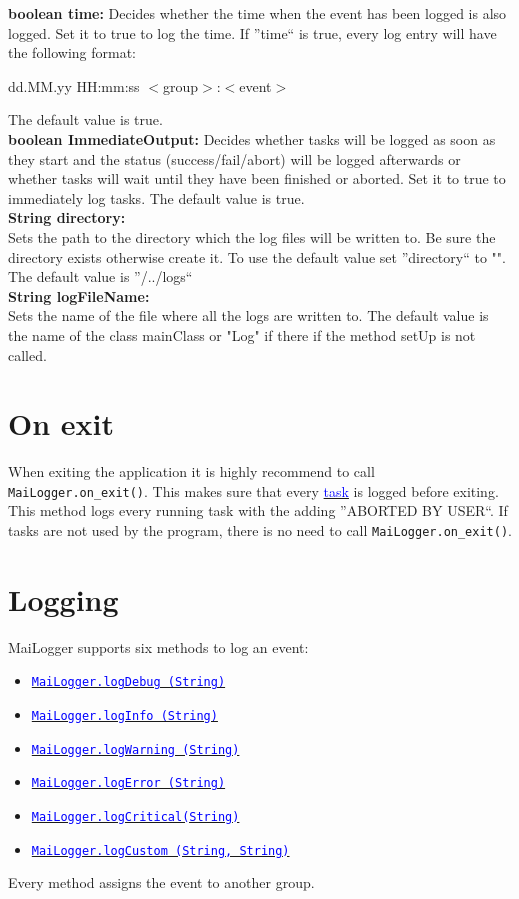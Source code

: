 \documentclass{article}
\newcommand{\refh}[2]{\hyperref[#1] {\textcolor{blue}{#2}}}
\newcommand{\logDebug}{\refh{logging_debug}{\lstinline|MaiLogger.logDebug (String)|}}
\newcommand{\logInfo}{\refh{logging_info}{\lstinline|MaiLogger.logInfo (String)|}}
\newcommand{\logWarning}{\refh{logging_warning}{\lstinline|MaiLogger.logWarning (String)|}}
\newcommand{\logError}{\refh{logging_error}{\lstinline|MaiLogger.logError (String)|}}
\newcommand{\logCritical}{\refh{logging_critical}{\lstinline|MaiLogger.logCritical(String)|}}
\newcommand{\logCustom}{\refh{logging_custom}{\lstinline|MaiLogger.logCustom (String, String)|}}
\begin{document}
    \textbf{boolean time:}
    Decides whether the time when the event has been logged is also logged.
    Set it to true to log the time.
    If ''time`` is true, every log entry will have the following format:
    \begin{description}
        \item dd.MM.yy HH:mm:ss $<$group$>$:$<$event$>$
    \end{description}
    The default value is true. \\
    
    \textbf{boolean ImmediateOutput:}
    Decides whether tasks will be logged as soon as they start and the status (success/fail/abort) will be logged afterwards or whether tasks will wait until they have been finished or aborted.
    Set it to true to immediately log tasks.
    The default value is true. \\

    \textbf{String directory:} \\
    Sets the path to the directory which the log files will be written to.
    Be sure the directory exists otherwise create it.
    To use the default value set ''directory`` to "".
    The default value is ''/../logs`` \\
    
    \textbf{String logFileName:} \\
    Sets the name of the file where all the logs are written to.
    The default value is the name of the class mainClass or "Log" if there if the method setUp is not called.

\section{On exit}
\label{on_exit}
    When exiting the application it is highly recommend to call \lstinline|MaiLogger.on_exit()|.
    This makes sure that every \refh{tasks}{task} is logged before exiting.
    This method logs every running task with the adding ''ABORTED BY USER``.
    If tasks are not used by the program, there is no need to call \lstinline|MaiLogger.on_exit()|.

\section{Logging}
\label{logging}
    MaiLogger supports six methods to log an event:
    \begin{itemize}
    	\item \logDebug
        \item \logInfo
        \item \logWarning
        \item \logError
        \item \logCritical
        \item \logCustom
    \end{itemize}
    Every method assigns the event to another group.
\end{document}

